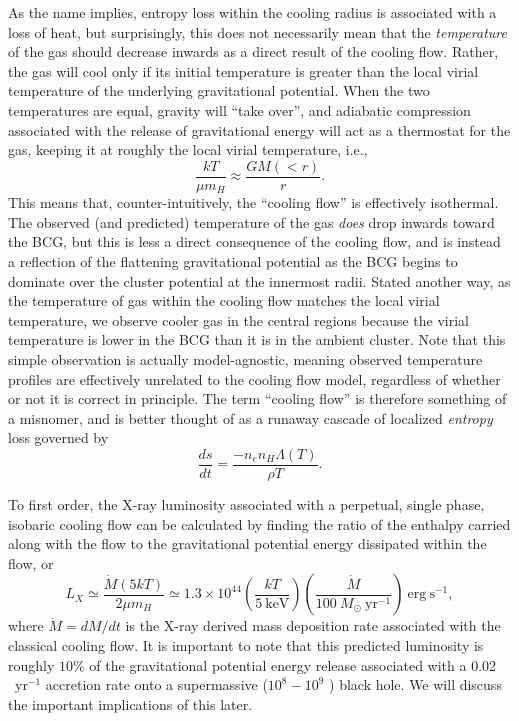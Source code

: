 As the name implies, entropy loss within the cooling radius is associated with a loss of heat, 
but surprisingly, this does not necessarily mean that the {\it temperature} of the gas should decrease 
inwards as a direct result of the cooling flow. Rather, the gas will cool only 
if its initial temperature is greater than the local virial temperature of the underlying gravitational potential. 
When the two temperatures are equal, gravity will ``take over'', and adiabatic compression associated with the release of gravitational 
energy will act as a thermostat for the gas, keeping it at roughly the local virial temperature, i.e.,
\begin{equation}
\frac{kT}{\mu m_H} \approx \frac{G M\left(<r \right)}{r}.
\end{equation}
This means that, counter-intuitively, the ``cooling flow'' is effectively isothermal. 
The observed (and predicted) temperature of the gas {\it does} drop inwards toward the BCG, 
but this is less a direct consequence of the cooling flow, and is instead a 
reflection 
of the flattening gravitational potential as the BCG begins to dominate over the cluster potential at the innermost radii.
Stated another way, as the temperature of gas within the cooling flow matches the local virial temperature,
we observe cooler gas in the central regions because the virial temperature is lower in the BCG than it is in the ambient cluster.
Note that this simple observation is actually model-agnostic, meaning 
observed temperature profiles are effectively unrelated to the cooling flow model, regardless of whether or not it is correct in principle. 
The term ``cooling flow'' is therefore something of a misnomer, and is better thought of as a runaway cascade of 
localized {\it entropy} loss governed by 
\begin{equation}
\frac{ds}{dt} = \frac{-n_e n_H \Lambda\left(T\right)}{\rho T}.
\end{equation} 


To first order, the X-ray luminosity associated with a perpetual, single phase, isobaric cooling flow can be calculated by 
finding the ratio of the enthalpy carried along with the flow to the gravitational potential energy dissipated within the flow, or  
\begin{equation}
L_X \simeq \frac{\dot{M} \left(5 kT\right)}{2\mu m_H} \simeq 1.3 \times 10^{44}  \left(  \frac{kT}{ 5~\mathrm{keV}}   \right) \left( \frac{\dot{M}}{100 ~M_\odot~\mathrm{yr}^{-1}}  \right) ~\mathrm{erg~s}^{-1},
\end{equation}
where  $\dot{M} = dM / dt$ is the X-ray derived mass deposition rate associated with the classical cooling flow. 
It is important to note that this predicted luminosity is roughly $10$\% of the gravitational potential energy release 
associated with a 0.02 \Msol\ yr$^{-1}$ accretion rate onto a supermassive ($10^8-10^9$ \Msol) black hole. We will discuss the important implications of this later.  



